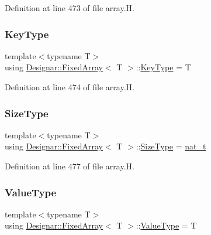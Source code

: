 Definition at line 473 of file array.\+H.

\mbox{\label{class_designar_1_1_fixed_array_a3a725cf21783340b8aca29dd1db0acf0}} 
\subsubsection{\texorpdfstring{Key\+Type}{KeyType}}
{\footnotesize\ttfamily template$<$typename T$>$ \\
using \hyperlink{class_designar_1_1_fixed_array}{Designar\+::\+Fixed\+Array}$<$ T $>$\+::\hyperlink{class_designar_1_1_fixed_array_a3a725cf21783340b8aca29dd1db0acf0}{Key\+Type} =  T}



Definition at line 474 of file array.\+H.

\mbox{\label{class_designar_1_1_fixed_array_a503ae414cc313d248e77c08e62ef043c}} 
\subsubsection{\texorpdfstring{Size\+Type}{SizeType}}
{\footnotesize\ttfamily template$<$typename T$>$ \\
using \hyperlink{class_designar_1_1_fixed_array}{Designar\+::\+Fixed\+Array}$<$ T $>$\+::\hyperlink{class_designar_1_1_fixed_array_a503ae414cc313d248e77c08e62ef043c}{Size\+Type} =  \hyperlink{namespace_designar_aa72662848b9f4815e7bf31a7cf3e33d1}{nat\+\_\+t}}



Definition at line 477 of file array.\+H.

\mbox{\label{class_designar_1_1_fixed_array_ac1cfeb4403a2dcbffd7ef494e5b873d0}} 
\subsubsection{\texorpdfstring{Value\+Type}{ValueType}}
{\footnotesize\ttfamily template$<$typename T$>$ \\
using \hyperlink{class_designar_1_1_fixed_array}{Designar\+::\+Fixed\+Array}$<$ T $>$\+::\hyperlink{class_designar_1_1_fixed_array_ac1cfeb4403a2dcbffd7ef494e5b873d0}{Value\+Type} =  T}



